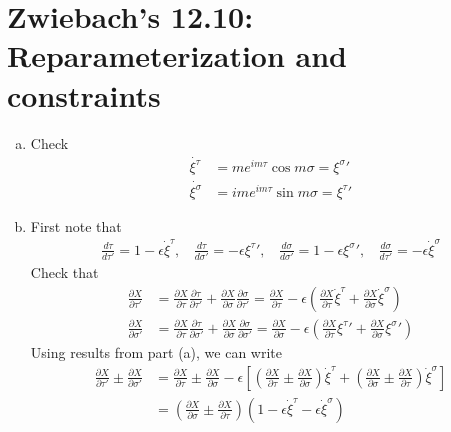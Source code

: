 \documentclass[11pt]{article}
\begin{document}
\newpage 
\section{Zwiebach's 12.10: Reparameterization and constraints}
\begin{enumerate} [(a)]
    \item Check 
    \begin{align*}
        \dot{\xi^\tau} &= me^{im\tau } \cos m\sigma = {\xi^\sigma} ' \\
        \dot{\xi^\sigma} &= im e^{im \tau} \sin m \sigma = {\xi^\tau} ' 
    \end{align*}

    \item First note that 
    \begin{align*}
        \frac{d \tau }{d \tau '} = 1 - \epsilon \dot{\xi}^\tau, ~~~~ \frac{d \tau }{d \sigma '} = - \epsilon {\xi^\tau} ', ~~~~ \frac{d \sigma }{d \sigma '} = 1- \epsilon {\xi^\sigma} ', ~~~~ \frac{d\sigma}{d \tau'} = - \epsilon \dot{\xi}^\sigma 
    \end{align*}
    Check that 
    \begin{align*}
        \frac{\partial X}{\partial \tau '} &= \frac{\partial X}{\partial \tau }\frac{\partial \tau}{\partial \tau '} +\frac{\partial X}{\partial \sigma } \frac{\partial \sigma }{\partial\tau'} = \frac{\partial X}{\partial \tau} - \epsilon \left( \frac{\partial X}{\partial \tau} \dot{\xi}^\tau + \frac{\partial X}{\partial \sigma} \dot{\xi}^\sigma \right) \\
        \frac{\partial X}{\partial \sigma '} &= \frac{\partial X}{\partial \tau}\frac{\partial \tau }{\partial \sigma'} + \frac{\partial X}{\partial \sigma} \frac{\partial \sigma }{\partial \sigma'} =  \frac{\partial X}{\partial \sigma} - \epsilon \left( \frac{\partial X}{\partial \tau} {\xi^\tau}' + \frac{\partial X}{\partial \sigma} {\xi^\sigma}' \right)
    \end{align*}
    Using results from part (a), we can write 
    \begin{align*}
        \frac{\partial X}{\partial \tau '} \pm \frac{\partial X}{\partial \sigma '} &= \frac{\partial X}{\partial \tau} \pm \frac{\partial X}{\partial \sigma} - \epsilon \left[ \left( \frac{\partial X}{\partial \tau} \pm \frac{\partial X}{\partial \sigma } \right) \dot{\xi}^\tau + \left( \frac{\partial X}{\partial \sigma} \pm \frac{\partial X}{\partial \tau } \right) \dot{\xi}^\sigma \right] \\
        &= \left( \frac{\partial X}{\partial \sigma} \pm \frac{\partial X}{\partial \tau } \right) \left( 1 - \epsilon \dot{\xi}^\tau - \epsilon \dot{\xi}^\sigma \right)

\end{align*}
\end{enumerate}
\end{document}
